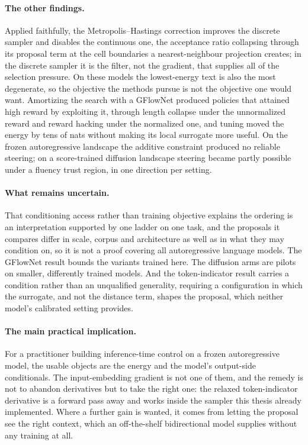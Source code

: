 \paragraph*{The other findings.} Applied faithfully, the Metropolis--Hastings correction improves the discrete sampler and disables the continuous one, the acceptance ratio collapsing through its proposal term at the cell boundaries a nearest-neighbour projection creates; in the discrete sampler it is the filter, not the gradient, that supplies all of the selection pressure. On these models the lowest-energy text is also the most degenerate, so the objective the methods pursue is not the objective one would want. Amortizing the search with a GFlowNet produced policies that attained high reward by exploiting it, through length collapse under the unnormalized reward and reward hacking under the normalized one, and tuning moved the energy by tens of nats without making its local surrogate more useful. On the frozen autoregressive landscape the additive constraint produced no reliable steering; on a score-trained diffusion landscape steering became partly possible under a fluency trust region, in one direction per setting.

\paragraph*{What remains uncertain.} That conditioning access rather than training objective explains the ordering is an interpretation supported by one ladder on one task, and the proposals it compares differ in scale, corpus and architecture as well as in what they may condition on, so it is not a proof covering all autoregressive language models. The GFlowNet result bounds the variants trained here. The diffusion arms are pilots on smaller, differently trained models. And the token-indicator result carries a condition rather than an unqualified generality, requiring a configuration in which the surrogate, and not the distance term, shapes the proposal, which neither model's calibrated setting provides.

\paragraph*{The main practical implication.} For a practitioner building inference-time control on a frozen autoregressive model, the usable objects are the energy and the model's output-side conditionals. The input-embedding gradient is not one of them, and the remedy is not to abandon derivatives but to take the right one: the relaxed token-indicator derivative is a forward pass away and works inside the sampler this thesis already implemented. Where a further gain is wanted, it comes from letting the proposal see the right context, which an off-the-shelf bidirectional model supplies without any training at all.
